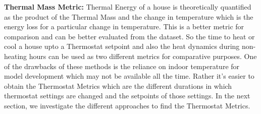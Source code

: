 \documentclass{sig-alternate}
\begin{document}
\indent \textbf{Thermal Mass Metric:} Thermal Energy of a house is theoretically quantified as the product of the Thermal Mass and the change in temperature which is the energy loss for a particular change in temperature. This is a better metric for comparison and can be better evaluated from the dataset. So the time to heat or cool a house upto a Thermostat setpoint and also the heat dynamics during non-heating hours can be used as two different metrics for comparative purposes. One of the drawbacks of these methods is the reliance on indoor temperature for model development which may not be available all the time. Rather it's easier to obtain the Thermostat Metrics which are the different durations in which thermostat settings are changed and the setpoints of those settings. In the next section, we investigate the different approaches to find the Thermostat Metrics. 
\end{document}
